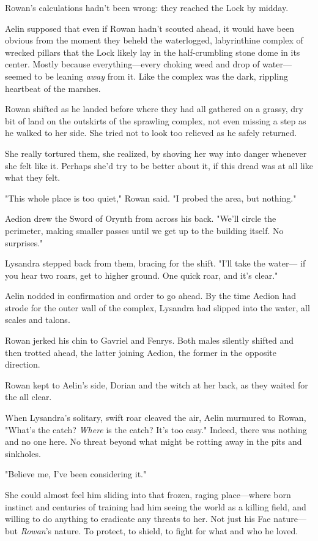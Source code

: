 Rowan's calculations hadn't been wrong: they reached the Lock by midday.

Aelin supposed that even if Rowan hadn't scouted ahead, it would have been obvious from the moment they beheld the waterlogged, labyrinthine complex of wrecked pillars that the Lock likely lay in the half-crumbling stone dome in its center.
Mostly because everything---every choking weed and drop of water--- seemed to be leaning \emph{away} from it.
Like the complex was the dark, rippling heartbeat of the marshes.

Rowan shifted as he landed before where they had all gathered on a grassy, dry bit of land on the outskirts of the sprawling complex, not even missing a step as he walked to her side.
She tried not to look too relieved as he safely returned.

She really tortured them, she realized, by shoving her way into danger whenever she felt like it.
Perhaps she'd try to be better about it, if this dread was at all like what they felt.

"This whole place is too quiet," Rowan said.
"I probed the area, but  nothing."

Aedion drew the Sword of Orynth from across his back.
"We'll circle the perimeter, making smaller passes until we get up to the building itself.
No surprises."

Lysandra stepped back from them, bracing for the shift.
"I'll take the water--- if you hear two roars, get to higher ground.
One quick roar, and it's clear."

Aelin nodded in confirmation and order to go ahead.
By the time Aedion had strode for the outer wall of the complex, Lysandra had slipped into the water, all scales and talons.

Rowan jerked his chin to Gavriel and Fenrys.
Both males silently shifted and then trotted ahead, the latter joining Aedion, the former in the opposite direction.

Rowan kept to Aelin's side, Dorian and the witch at her back, as they waited for the all clear.

When Lysandra's solitary, swift roar cleaved the air, Aelin murmured to Rowan, "What's the catch?
\emph{Where} is the catch?
It's too easy."
Indeed, there was nothing and no one here.
No threat beyond what might be rotting away in the pits and sinkholes.

"Believe me, I've been considering it."

She could almost feel him sliding into that frozen, raging place---where born instinct and centuries of training had him seeing the world as a killing field, and willing to do anything to eradicate any threats to her.
Not just his Fae nature--- but \emph{Rowan}'s nature.
To protect, to shield, to fight for what and who he loved.

